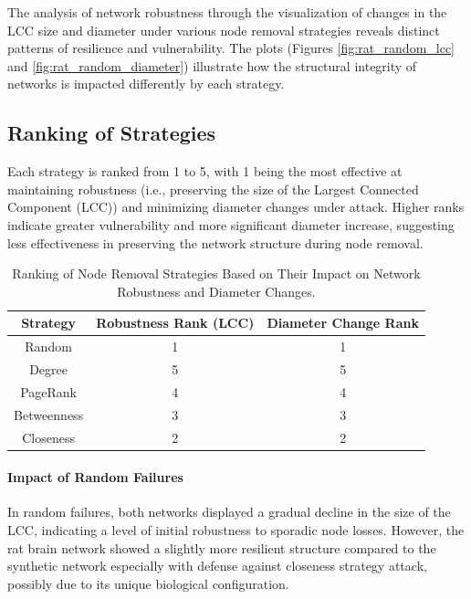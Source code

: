 \documentclass[
	report, %
	11pt, %
]{CSUniSchoolLabReport}
\newcounter{ct}
\begin{document}
The analysis of network robustness through the visualization of changes in the LCC size and diameter under various node removal strategies reveals distinct patterns of resilience and vulnerability. The plots (Figures \ref{fig:rat_random_lcc} and \ref{fig:rat_random_diameter}) illustrate how the structural integrity of networks is impacted differently by each strategy.
\subsection{Ranking of Strategies}
Each strategy is ranked from 1 to 5, with 1 being the most effective at maintaining robustness (i.e., preserving the size of the Largest Connected Component (LCC)) and minimizing diameter changes under attack. Higher ranks indicate greater vulnerability and more significant diameter increase, suggesting less effectiveness in preserving the network structure during node removal.
\begin{table}[H]
	\centering
	\captionsetup{justification=centering}
	\begin{tabular}{|c|c|c|}
		\hline
		\rowcolor{SeaGreen} \textbf{Strategy} & \textbf{Robustness Rank (LCC)} & \textbf{Diameter Change Rank} \\ \hline
		Random            & 1                              & 1                             \\ \hline
		Degree            & 5                              & 5                             \\ \hline
		PageRank          & 4                              & 4                             \\ \hline
		Betweenness       & 3                              & 3                             \\ \hline
		Closeness         & 2                              & 2                             \\ \hline
	\end{tabular}
	\caption{Ranking of Node Removal Strategies Based on Their Impact on Network Robustness and Diameter Changes.}
\end{table}

\paragraph{Impact of Random Failures}
In random failures, both networks displayed a gradual decline in the size of the LCC, indicating a level of initial robustness to sporadic node losses. However, the rat brain network showed a slightly more resilient structure compared to the synthetic network especially with defense against closeness strategy attack, possibly due to its unique biological configuration.
\end{document}
